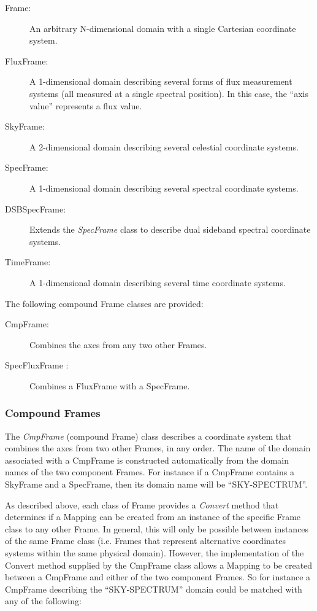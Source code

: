 \documentclass[final,authoryear,5p,times,twocolumn]{elsarticle}
\begin{document}
\begin{description}
\item[Frame:] An arbitrary N-dimensional domain with a single Cartesian
coordinate system.
\item[FluxFrame:] A 1-dimensional domain describing several forms of flux
measurement systems (all measured at a single spectral position). In this
case, the ``axis value'' represents a flux value.
\item[SkyFrame:] A 2-dimensional domain describing several celestial
coordinate systems.
\item[SpecFrame:] A 1-dimensional domain describing several spectral
coordinate systems.
\item[DSBSpecFrame:] Extends the \emph{SpecFrame} class to describe dual
sideband spectral coordinate systems.
\item[TimeFrame:] A 1-dimensional domain describing several time coordinate
systems.
\end{description}

The following compound Frame classes are provided:

\begin{description}
\item[CmpFrame:] Combines the axes from any two other Frames.
\item[SpecFluxFrame :] Combines a FluxFrame with a SpecFrame.
\end{description}

\subsubsection{Compound Frames}
The \emph{CmpFrame} (compound Frame) class describes a coordinate system
that combines the axes from two other Frames, in any order. The name of
the domain associated with a CmpFrame is constructed automatically from
the domain names of the two component Frames. For instance if a CmpFrame
contains a SkyFrame and a SpecFrame, then its domain name will be
``SKY-SPECTRUM''.

As described above, each class of Frame provides a \emph{Convert} method
that determines if a Mapping can be created from an instance of the specific
Frame class to any other Frame. In general, this will only be possible
between instances of the same Frame class (i.e. Frames that represent
alternative coordinates systems within the same physical domain).
However, the implementation of the Convert method supplied by the
CmpFrame class allows a Mapping to be created between a CmpFrame and
either of the two component Frames. So for instance a CmpFrame describing
the ``SKY-SPECTRUM'' domain could be matched with any of the following:
\end{document}
